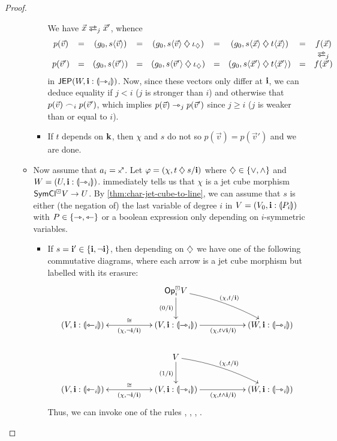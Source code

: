 \documentclass[a4paper]{memoir}
\begin{document}
\begin{proof}
\begin{itemize}
\begin{itemize}
\begin{itemize}
				We have $\vec x \infrajet_j \vec x'$, whence
				\[
					\begin{array}{c c c c c c c c c}
					p(\vec v)
					&=& (g_0, s \psub{\vec v})
					&=& (g_0, s \psub{\vec v} \opA \neutralA)
					&=& (g_0, s \psub{\vec x} \opA t \psub{\vec x})
					&=& f(\vec x)
					\\
					&&&&&&&& \infrajet_j
					\\
					p(\vec v')
					&=& (g_0, s \psub{\vec v'})
					&=& (g_0, s \psub{\vec v'} \opA \neutralA)
					&=& (g_0, s \psub{\vec x'} \opA t \psub{\vec x'})
					&=& f(\vec x')
					\end{array}
				\]
				in $\mathsf{JEP}(W, \mathbf{i} : {\llparenthesis \rightarrowtriangle_i \rrparenthesis})$.
				Now, since these vectors only differ at $\mathbf{i}$, we can deduce equality if $j < i$ ($j$ is stronger than $i$) and otherwise that $p(\vec v) \frown_i p(\vec v')$, which implies $p(\vec v) \rightarrowtriangle_j p(\vec v')$ since $j \geq i$ ($j$ is weaker than or equal to $i$).
				
				\item If $t$ depends on $\mathbf{k}$, then $\chi$ and $s$ do not so $p(\vec v) = p(\vec v')$ and we are done.
			\end{itemize}
			
			\item Now assume that $a_i = \ypolar$.
			Let $\varphi = (\chi, t \mathbin{\diamondsuit} s/\mathbf{i})$ where $\mathbin{\diamondsuit} \in \mathopen{}\left\{ {\vee}, {\wedge} \right\}\mathclose{}$ and $W = (U, \mathbf{i} : {\llparenthesis \rightarrowtriangle_i \rrparenthesis})$.
			 immediately tells us that $\chi$ is a jet cube morphism $\mathsf{SymCl}^\boxdot V \to U$.
			By \cref{thm:char-jet-cube-to-line}, we can assume that $s$ is either (the negation of) the last variable of degree $i$ in $V = (V_0, \mathbf{i} : {\llparenthesis P_i \rrparenthesis})$ with $P \in \mathopen{}\left\{ \rightarrowtriangle, \leftarrowtriangle \right\}\mathclose{}$ or a boolean expression only depending on $i$-symmetric variables.
			\begin{itemize}
				\item If $s = \mathbf{i}' \in \mathopen{}\left\{ \mathbf{i}, \lnot \mathbf{i} \right\}\mathclose{}$, then depending on $\mathbin{\diamondsuit}$ we have one of the following commutative diagrams, where each arrow is a jet cube morphism but labelled with its erasure:
				\[
					\xymatrix{
						&&\Opcube_i V
							\ar[d]_{(0/\dm i)}
							\ar@/^/[rrd]^{(\chi, t/\dm i)}
						\\
						(V, \dm i : \rival{\tej_i})
							\ar@{<->}[rr]^{\cong}_{(\chi, \lnot \dm i/\dm i)}
						&&
						(V, \dm i : \rival{\jet_i})
							\ar[rr]_{(\chi, t \vee \dm i/\dm i)}
						&&
						(W, \dm i : \rival{\jet_i})
						\\
						&& V
							\ar[d]_{(1/\dm i)}
							\ar@/^/[rrd]^{(\chi, t/\dm i)}
						\\
						(V, \dm i : \rival{\tej_i})
							\ar@{<->}[rr]^{\cong}_{(\chi, \lnot \dm i/\dm i)}
						&&
						(V, \dm i : \rival{\jet_i})
							\ar[rr]_{(\chi, t \wedge \dm i/\dm i)}
						&&
						(W, \dm i : \rival{\jet_i})
					}
				\]
				Thus, we can invoke one of the rules , \allowbreak {}, , .
				

\end{itemize}
\end{itemize}
\end{itemize}
\end{proof}
\end{document}
